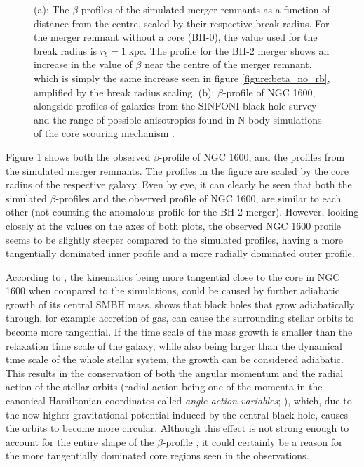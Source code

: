 \documentclass[english, twoside]{HYgradu}
\begin{document}
\begin{figure}
	\caption{(a): The $\beta$-profiles of the simulated merger remnants as a function of distance from the centre, scaled by their respective break radius. For the merger remnant without a core (BH-0), the value used for the break radius is $r_b = 1 \; \mathrm{kpc}$. The profile for the BH-2 merger shows an increase in the value of $\beta$ near the centre of the merger remnant, which is simply the same increase seen in figure \ref{figure:beta_no_rb}, amplified by the break radius scaling. (b): $\beta$-profile of NGC 1600, alongside profiles of galaxies from the SINFONI black hole survey \citep{Saglia2016} and the range of possible anisotropies found in N-body simulations of the core scouring mechanism \citep{Thomas2016}.}
	\label{figure:beta_NGC1600_Simul}
\end{figure}

Figure \ref{figure:beta_NGC1600_Simul} shows both the observed $\beta$-profile of NGC 1600, and the profiles from the simulated merger remnants. The profiles in the figure are scaled by the core radius of the respective galaxy. Even by eye, it can clearly be seen that both the simulated $\beta$-profiles and the observed profile of NGC 1600, are similar to each other (not counting the anomalous profile for the BH-2 merger). However, looking closely at the values on the axes of both plots, the observed NGC 1600 profile seems to be slightly steeper compared to the simulated profiles, having a more tangentially dominated inner profile and a more radially dominated outer profile. 


According to \cite{Rantala2018}, the kinematics being more tangential close to the core in NGC 1600 when compared to the simulations, could be caused by further adiabatic growth of its central SMBH mass. \cite{Young1980} shows that black holes that grow adiabatically through, for example accretion of gas, can cause the surrounding stellar orbits to become more tangential. If the time scale of the mass growth is smaller than the relaxation time scale of the galaxy, while also being larger than the dynamical time scale of the whole stellar system, the growth can be considered adiabatic. This results in the conservation of both the angular momentum and the radial action of the stellar orbits (radial action being one of the momenta in the canonical Hamiltonian coordinates called \textit{angle-action variables}; \citealt{BinneyTremaine}), which, due to the now higher gravitational potential induced by the central black hole, causes the orbits to become more circular. Although this effect is not strong enough to account for the entire shape of the $\beta$-profile \citep{Thomas2016}, it could certainly be a reason for the more tangentially dominated core regions seen in the observations.
\end{document}
